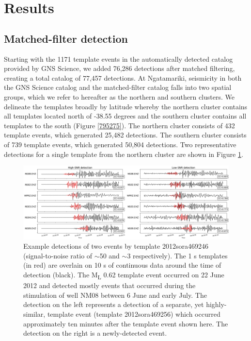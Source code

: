 \section{Results}
\subsection{Matched-filter detection}\label{MF-results}
Starting with the 1171 template events in the automatically detected catalog provided by GNS Science, we added 76,286 detections after matched filtering, creating a total catalog of 77,457 detections. At Ngatamariki, seismicity in both the GNS Science catalog and the matched-filter catalog falls into two spatial groups, which we refer to hereafter as the northern and southern clusters. We delineate the templates broadly by latitude whereby the northern cluster contains all templates located north of -38.55 degrees and the southern cluster contains all templates to the south (Figure \ref{795275}). The northern cluster consists of 432 template events, which generated 25,482 detections. The southern cluster consists of 739 template events, which generated 50,804 detections. Two representative detections for a single template from the northern cluster are shown in Figure \ref{971628}.

\begin{figure}[h!]
\begin{center}
\includegraphics[width=1.00\columnwidth]{Chapter_3_Nga/figures/2012sora453983_20120619_051750460000/det_example_publication_original}
\caption{{Example detections of two events by template 2012sora469246
(signal-to-noise ratio of $\sim$50 and $\sim$3
respectively). The 1 s templates (in red) are overlain on 10 s of
continuous data around the time of detection (black). The
M\textsubscript{L} 0.62 template event occurred on 22 June 2012 and
detected mostly events that occurred during the stimulation of well NM08
between 6 June and early July. The detection on the left represents a
detection of a separate, yet highly-similar, template event (template
2012sora469256) which occurred approximately ten minutes after the
template event shown here. The detection on the right is a
newly-detected event.
{\label{971628}}%
}}
\end{center}
\end{figure}

